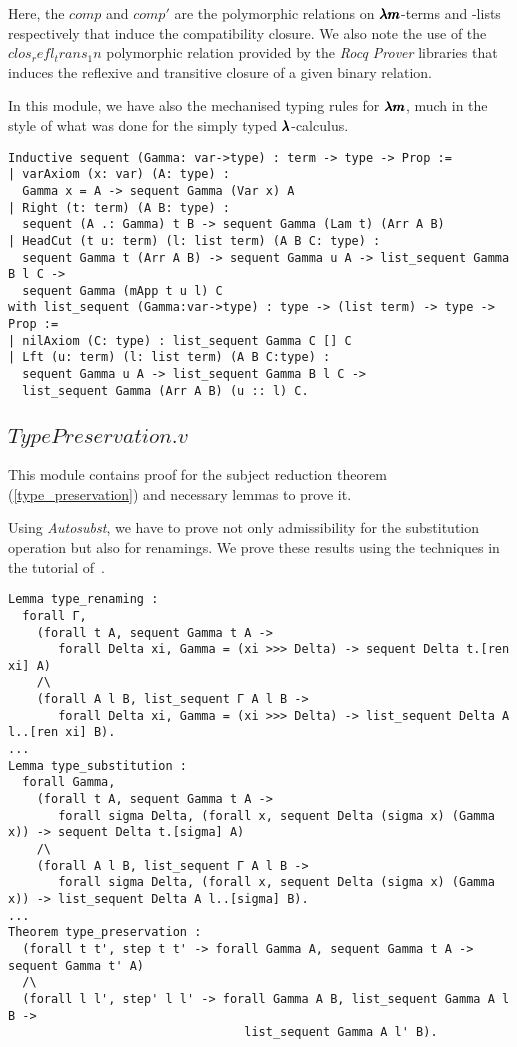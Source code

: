 Here, the \lst$comp$ and \lst$comp'$ are the polymorphic relations on $\pmb{\lambda m}$-terms and -lists respectively that induce the compatibility closure.
We also note the use of the \lst$clos_refl_trans_1n$ polymorphic relation provided by the \textit{Rocq Prover} libraries that induces the reflexive and transitive closure of a given binary relation.

In this module, we have also the mechanised typing rules for $\pmb{\lambda m}$, much in the style of what was done for the simply typed $\pmb{\lambda}$-calculus.
\begin{lstlisting}[language=Coq]
Inductive sequent (Gamma: var->type) : term -> type -> Prop := 
| varAxiom (x: var) (A: type) :
  Gamma x = A -> sequent Gamma (Var x) A
| Right (t: term) (A B: type) :
  sequent (A .: Gamma) t B -> sequent Gamma (Lam t) (Arr A B)
| HeadCut (t u: term) (l: list term) (A B C: type) :
  sequent Gamma t (Arr A B) -> sequent Gamma u A -> list_sequent Gamma B l C ->
  sequent Gamma (mApp t u l) C
with list_sequent (Gamma:var->type) : type -> (list term) -> type -> Prop :=
| nilAxiom (C: type) : list_sequent Gamma C [] C
| Lft (u: term) (l: list term) (A B C:type) :
  sequent Gamma u A -> list_sequent Gamma B l C ->
  list_sequent Gamma (Arr A B) (u :: l) C.
\end{lstlisting}

\subsection{\lst$TypePreservation.v$}

This module contains proof for the subject reduction theorem (\cref{type_preservation}) and necessary lemmas to prove it.

Using \textit{Autosubst}, we have to prove not only admissibility for the substitution operation but also for renamings.
We prove these results using the techniques in the tutorial of~\cite{AutosubstManual}.
\begin{lstlisting}[language=Coq]
Lemma type_renaming :
  forall Γ,
    (forall t A, sequent Gamma t A ->
       forall Delta xi, Gamma = (xi >>> Delta) -> sequent Delta t.[ren xi] A)
    /\
    (forall A l B, list_sequent Γ A l B ->
       forall Delta xi, Gamma = (xi >>> Delta) -> list_sequent Delta A l..[ren xi] B).
...
Lemma type_substitution :
  forall Gamma, 
    (forall t A, sequent Gamma t A ->
       forall sigma Delta, (forall x, sequent Delta (sigma x) (Gamma x)) -> sequent Delta t.[sigma] A)
    /\
    (forall A l B, list_sequent Γ A l B ->
       forall sigma Delta, (forall x, sequent Delta (sigma x) (Gamma x)) -> list_sequent Delta A l..[sigma] B).
...
Theorem type_preservation :
  (forall t t', step t t' -> forall Gamma A, sequent Gamma t A -> sequent Gamma t' A)
  /\
  (forall l l', step' l l' -> forall Gamma A B, list_sequent Gamma A l B ->
                                 list_sequent Gamma A l' B).
\end{lstlisting}

